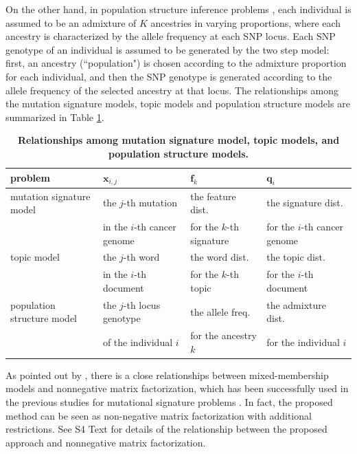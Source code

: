 \documentclass[10pt,letterpaper]{article}
\begin{document}
On the other hand, in population structure inference problems \cite{pmid10835412, pmid19648217}, 
each individual is assumed to be an admixture of $K$ ancestries in varying proportions, 
where each ancestry is characterized by the allele frequency at each SNP locus.
Each SNP genotype of an individual is assumed to be generated by the two step model:
first, an ancestry (``population") is chosen according to the admixture proportion for each individual,
and then the SNP genotype is generated according to the allele frequency of the selected ancestry at that locus.
The relationships among the mutation signature models, topic models and population structure models are summarized in Table \ref{tab_pop}.


\begin{table}[!ht]
\begin{adjustwidth}{-2.25in}{0in} %
\caption{
{\bf Relationships among mutation signature model, topic models, and population structure models.}
}
\begin{tabular}{|l|l|l|l|} \hline
problem & $\bm{x}_{i,j}$ & $\bm{f}_{k}$ & $\bm{q}_{i}$  \\ \hline
mutation signature model & the $j$-th mutation  & the feature dist.  & the signature dist.  \\
& in the $i$-th cancer genome & for the $k$-th signature & for the $i$-th cancer genome \\ \hline
topic model &  the $j$-th word & the word dist. & the topic dist. \\ 
& in the $i$-th document & for the $k$-th topic & for the $i$-th document \\ \hline
population structure model & the $j$-th locus genotype & the allele freq.  & the admixture dist. \\
& of the individual $i$  & for the ancestry $k$ & for the individual $i$ \\
\hline 
\end{tabular}
\label{tab_pop}
\end{adjustwidth}
\end{table}


As pointed out by \cite{ding2008equivalence}, there is a  close relationships between mixed-membership models and nonnegative matrix factorization,
which has been successfully used in the previous studies for mutational signature problems \cite{pmid22608084, pmid23318258, pmid23945592}.
In fact, the proposed method can be seen as non-negative matrix factorization with additional restrictions.
See S4 Text  for details of the relationship between the proposed approach and nonnegative matrix factorization.
\end{document}
